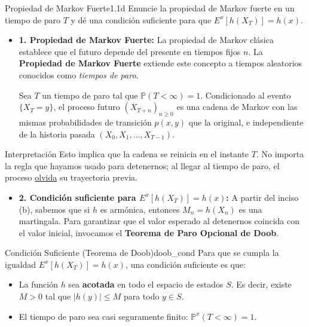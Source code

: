 \documentclass[10pt,a4paper]{article}
\begin{document}
\begin{ejercicio}{Propiedad de Markov Fuerte}{1.1d}
    Enuncie la propiedad de Markov fuerte en un tiempo de paro $T$ 
    y dé una condición suficiente para que $E^{x}[h(X_{T})] = h(x)$.
\end{ejercicio}

\vspace{5mm}

\begin{itemize}
    \item \textbf{1. Propiedad de Markov Fuerte:}
    La propiedad de Markov clásica establece que el futuro depende del presente en tiempos fijos $n$. La \textbf{Propiedad de Markov Fuerte} extiende este concepto a tiempos aleatorios conocidos como \textit{tiempos de paro}.
    
    Sea $T$ un tiempo de paro tal que $\mathbb{P}(T < \infty) = 1$. Condicionado al evento $\{X_T = y\}$, el proceso futuro $(X_{T+n})_{n \ge 0}$ es una cadena de Markov con las mismas probabilidades de transición $p(x,y)$ que la original, e independiente de la historia pasada $(X_0, X_1, \dots, X_{T-1})$.
\end{itemize}

\vspace{5mm}


\begin{nota}{Interpretación}
    Esto implica que la cadena se reinicia en el instante $T$. No importa la regla que hayamos usado para detenernos; al llegar al tiempo de paro, el proceso \ul{olvida} su trayectoria previa.
\end{nota}

\vspace{5mm}


\begin{itemize}
    \item \textbf{2. Condición suficiente para $E^x[h(X_T)] = h(x)$:}
    A partir del inciso (b), sabemos que si $h$ es armónica, entonces $M_n = h(X_n)$ es una martingala. Para garantizar que el valor esperado al detenernos coincida con el valor inicial, invocamos el \textbf{Teorema de Paro Opcional de Doob}.
\end{itemize}

\vspace{5mm}


\begin{mytheo}{Condición Suficiente (Teorema de Doob)}{doob_cond}
    Para que se cumpla la igualdad $E^x[h(X_T)] = h(x)$, una condición suficiente es que:
    \begin{itemize}
        \item La función $h$ sea \textbf{acotada} en todo el espacio de estados $S$. Es decir, existe $M > 0$ tal que $|h(y)| \le M$ para todo $y \in S$.
        \item El tiempo de paro sea casi seguramente finito: $\mathbb{P}^x(T < \infty) = 1$.
    \end{itemize}
\end{mytheo}
\end{document}
